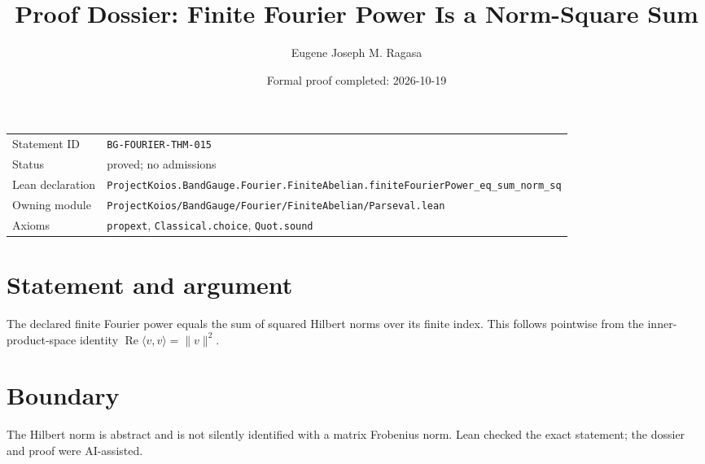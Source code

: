 \documentclass[11pt]{article}
\title{Proof Dossier: Finite Fourier Power Is a Norm-Square Sum}
\author{Eugene Joseph M. Ragasa}
\date{Formal proof completed: 2026-10-19}
\begin{document}
\maketitle
\noindent\begin{tabularx}{\textwidth}{@{}lX@{}}\toprule
Statement ID & \texttt{BG-FOURIER-THM-015} \\
Status & proved; no admissions \\
Lean declaration & \texttt{ProjectKoios.BandGauge.Fourier.FiniteAbelian.}\newline\texttt{finiteFourierPower\_eq\_sum\_norm\_sq} \\
Owning module & \texttt{ProjectKoios/BandGauge/Fourier/FiniteAbelian/Parseval.lean} \\
Axioms & \texttt{propext}, \texttt{Classical.choice}, \texttt{Quot.sound} \\
\bottomrule\end{tabularx}
\section{Statement and argument}
The declared finite Fourier power equals the sum of squared Hilbert norms over its finite index. This follows pointwise from the inner-product-space identity $\operatorname{Re}\langle v,v\rangle=\lVert v\rVert^2$.
\section{Boundary}
The Hilbert norm is abstract and is not silently identified with a matrix Frobenius norm. Lean checked the exact statement; the dossier and proof were AI-assisted.
\end{document}
